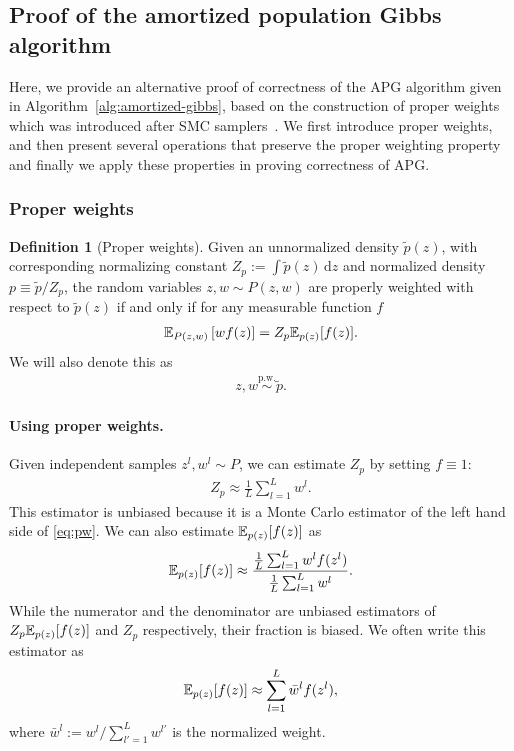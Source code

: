 \documentclass[anonymous=false, %
               format=acmsmall, %
               review=true, %
               screen=true, %
               nonacm=true]{acmart}
\theoremstyle{definition}
\newtheorem{definition}{Definition}
\newcommand{\pw}{\overset{\text{p.w.}}{\sim}
}
\begin{document}
\subsection{Proof of the amortized population Gibbs algorithm}
\label{appendix:proof-algo}

Here, we provide an alternative proof of correctness of the APG algorithm given in Algorithm~\ref{alg:amortized-gibbs}, based on the construction of proper weights~\cite{naesseth2015nested} which was introduced after SMC samplers~\cite{delmoral2006sequential}.
We first introduce proper weights, and then present several operations that preserve the proper weighting property and finally we apply these properties in proving correctness of APG.

\subsubsection{Proper weights}

\begin{definition}[Proper weights]
    Given an unnormalized density $\tilde p(z)$, with corresponding normalizing constant $Z_p := \int \tilde p(z) \,\mathrm dz$ and normalized density $p \equiv \tilde p / Z_p$, the random variables $z, w \sim P(z, w)$ are properly weighted with respect to $\tilde p(z)$ if and only if for any measurable function $f$
    \begin{align}
    \label{eq:pw}
    \mathbb{E}_{P(z, w)}\left[w f(z)\right] = Z_p \mathbb{E}_{p(z)}[f(z)]. 
    \end{align}
    We will also denote this as
    \begin{align*}
        z, w \pw \tilde p.
    \end{align*}
\end{definition}

\paragraph{Using proper weights.}
Given independent samples $z^l, w^l \sim P$, we can estimate $Z_p$ by setting $f \equiv 1$:
\begin{align*}
    Z_p \approx \frac{1}{L} \sum_{l = 1}^L w^l.
\end{align*}
This estimator is unbiased because it is a Monte Carlo estimator of the left hand side of \eqref{eq:pw}.
We can also estimate $\mathbb{E}_{p(z)}[f(z)]$ as
\begin{align*}
    \mathbb{E}_{p(z)}[f(z)] \approx \frac{\frac{1}{L} \sum_{l = 1}^L w^l f(z^l)}{\frac{1}{L} \sum_{l = 1}^L w^l}.
\end{align*}
While the numerator and the denominator are unbiased estimators of $Z_p \mathbb{E}_{p(z)}[f(z)]$ and $Z_p$ respectively, their fraction is biased.
We often write this estimator as
\begin{align}
    \mathbb{E}_{p(z)}[f(z)] \approx \sum_{l = 1}^L \bar w^l f(z^l), \label{eq:pw-estimation}
\end{align}
where $\bar w^l := w^l / \sum_{l' = 1}^L w^{l'}$ is the normalized weight.
\end{document}
